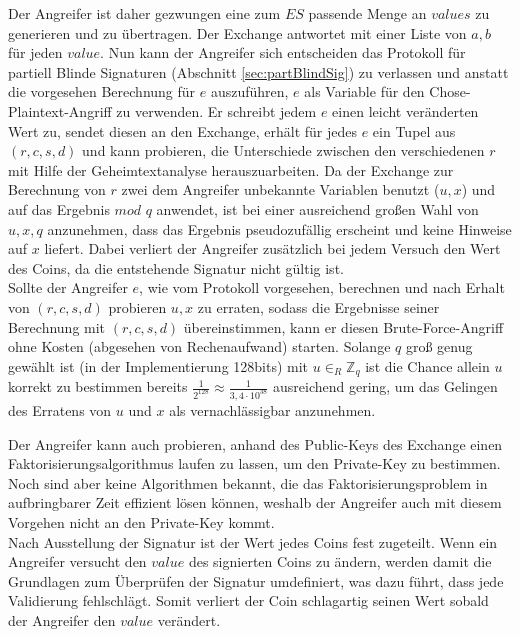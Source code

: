 \documentclass{scrreprt}
\begin{document}
Der Angreifer ist daher gezwungen eine zum $ES$ passende Menge an $values$ zu generieren und zu übertragen. Der Exchange antwortet mit einer Liste von $a,b$ für jeden $value$. Nun kann der Angreifer sich entscheiden das Protokoll für partiell Blinde Signaturen (Abschnitt \ref{sec:partBlindSig}) zu verlassen und anstatt die vorgesehen Berechnung für $e$ auszuführen, $e$ als Variable für den Chose-Plaintext-Angriff zu verwenden. Er schreibt jedem $e$ einen leicht veränderten Wert zu, sendet diesen an den Exchange, erhält für jedes $e$ ein Tupel aus $(r,c,s,d)$ und kann probieren, die Unterschiede zwischen den verschiedenen $r$ mit Hilfe der Geheimtextanalyse herauszuarbeiten.  Da der Exchange zur Berechnung von $r$ zwei dem Angreifer unbekannte Variablen benutzt ($u,x$) und auf das Ergebnis $mod$ $q$ anwendet, ist bei einer ausreichend großen Wahl von $u,x,q$ anzunehmen, dass das Ergebnis pseudozufällig erscheint und keine Hinweise auf $x$ liefert. Dabei verliert der Angreifer zusätzlich bei jedem Versuch den Wert des Coins, da die entstehende Signatur nicht gültig ist.\\

Sollte der Angreifer $e$, wie vom Protokoll vorgesehen, berechnen und nach Erhalt von $(r,c,s,d)$ probieren $u,x$ zu erraten, sodass die Ergebnisse seiner Berechnung mit $(r,c,s,d)$ übereinstimmen, kann er diesen Brute-Force-Angriff ohne Kosten (abgesehen von Rechenaufwand) starten. Solange $q$ groß genug gewählt ist (in der Implementierung 128bits) mit $u{\in}_{R} {\mathbb{Z}}_{q}$ ist die Chance allein $u$ korrekt zu bestimmen bereits $\frac{1}{2^{128}} \approx \frac{1}{3,4\cdot10^{38}}$ ausreichend gering, um das Gelingen des Erratens von $u$ und $x$ als vernachlässigbar anzunehmen.

Der Angreifer kann auch probieren, anhand des Public-Keys des Exchange einen Faktorisierungsalgorithmus laufen zu lassen, um den Private-Key zu bestimmen. Noch sind aber keine Algorithmen bekannt, die das Faktorisierungsproblem in aufbringbarer Zeit effizient lösen können, weshalb der Angreifer auch mit diesem Vorgehen nicht an den Private-Key kommt.\\

Nach Ausstellung der Signatur ist der Wert jedes Coins fest zugeteilt. Wenn ein Angreifer versucht den $value$ des signierten Coins zu ändern, werden damit die Grundlagen zum Überprüfen der Signatur umdefiniert, was dazu führt, dass jede Validierung fehlschlägt. Somit verliert der Coin schlagartig seinen Wert sobald der Angreifer den $value$ verändert.\\
\end{document}
